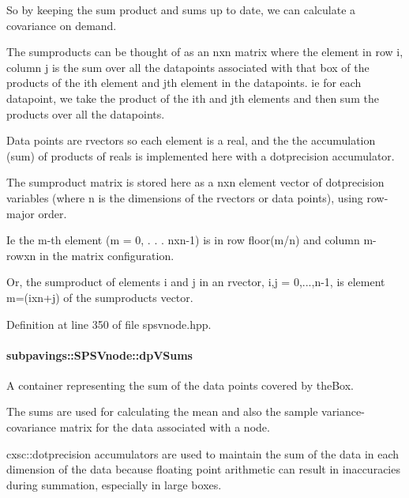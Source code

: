 \-So by keeping the sum product and sums up to date, we can calculate a covariance on demand.

\-The sumproducts can be thought of as an nxn matrix where the element in row i, column j is the sum over all the datapoints associated with that box of the products of the ith element and jth element in the datapoints. ie for each datapoint, we take the product of the ith and jth elements and then sum the products over all the datapoints.

\-Data points are rvectors so each element is a real, and the the accumulation (sum) of products of reals is implemented here with a dotprecision accumulator.

\-The sumproduct matrix is stored here as a nxn element vector of dotprecision variables (where n is the dimensions of the rvectors or data points), using row-\/major order.

\-Ie the m-\/th element (m = 0, . . . nxn-\/1) is in row floor(m/n) and column m-\/rowxn in the matrix configuration.

\-Or, the sumproduct of elements i and j in an rvector, i,j = 0,...,n-\/1, is element m=(ixn+j) of the sumproducts vector. 

\-Definition at line 350 of file spsvnode.\-hpp.

\hypertarget{classsubpavings_1_1SPSVnode_a60f29b9bd7f1a448515c5465e5f7f1ba}{
\paragraph[{dp\-V\-Sums}]{ {\bf subpavings\-::\-S\-P\-S\-Vnode\-::dp\-V\-Sums}}}\label{classsubpavings_1_1SPSVnode_a60f29b9bd7f1a448515c5465e5f7f1ba}


\-A container representing the sum of the data points covered by the\-Box. 

\-The sums are used for calculating the mean and also the sample variance-\/covariance matrix for the data associated with a node.

cxsc\-::dotprecision accumulators are used to maintain the sum of the data in each dimension of the data because floating point arithmetic can result in inaccuracies during summation, especially in large boxes.

